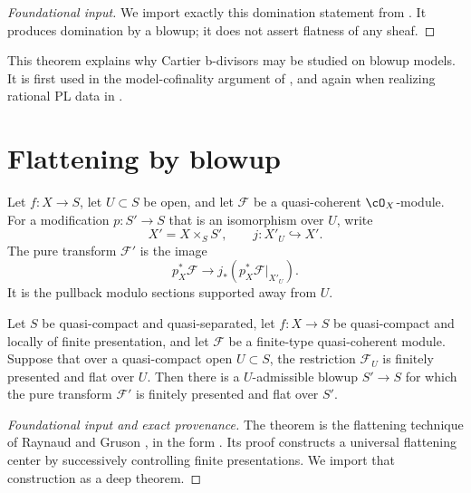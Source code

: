 \begin{proof}[Foundational input]
We import exactly this domination statement from
\cite[\href{https://stacks.math.columbia.edu/tag/081T}{Tag 081T}]
{stacks-project}.  It produces domination by a blowup; it does not assert
flatness of any sheaf.
\end{proof}

This theorem explains why Cartier b-divisors may be studied on blowup
models.  It is first used in the model-cofinality argument of
, and again when realizing rational PL data in
.

\section{Flattening by blowup}
\label{sec:appB-flattening}

\begin{definition}
\label{def:appB-pure-transform}
Let \(f:X\to S\), let \(U\subset S\) be open, and let
\(\mathcal F\) be a quasi-coherent \(\cO_X\)-module.  For a modification
\(p:S'\to S\) that is an isomorphism over \(U\), write
\[
 X'=X\times_SS',\qquad
 j:X'_{U}\hookrightarrow X'.
\]
The pure transform \(\mathcal F'\) is the image
\[
 p_X^*\mathcal F\longrightarrow
 j_*(p_X^*\mathcal F|_{X'_U}).
\tag{B.4}\label{eq:appB-pure-transform}
\]
It is the pullback modulo sections supported away from \(U\).
\end{definition}

\begin{theorem}\label{thm:appB-flattening}
Let \(S\) be quasi-compact and quasi-separated, let
\(f:X\to S\) be quasi-compact and locally of finite presentation, and let
\(\mathcal F\) be a finite-type quasi-coherent module.  Suppose that over a
quasi-compact open \(U\subset S\), the restriction \(\mathcal F_U\) is
finitely presented and flat over \(U\).  Then there is a \(U\)-admissible
blowup \(S'\to S\) for which the pure transform \(\mathcal F'\) is finitely
presented and flat over \(S'\).
\end{theorem}

\begin{proof}[Foundational input and exact provenance]
The theorem is the flattening technique of Raynaud and Gruson
\cite{RaynaudGruson1971}, in the form
\cite[\href{https://stacks.math.columbia.edu/tag/0815}{Tag 0815}]
{stacks-project}.  Its proof constructs a universal flattening center by
successively controlling finite presentations.  We import that
construction as a deep theorem.
\end{proof}

